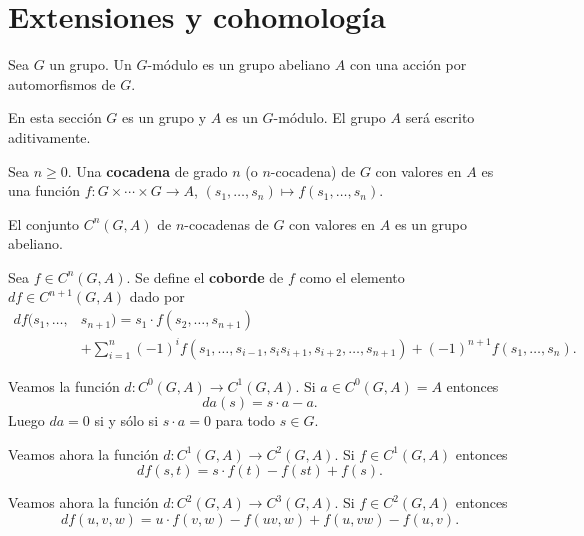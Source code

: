 \chapter{Extensiones y cohomología}

\begin{definition}
	Sea $G$ un grupo. Un $G$-módulo es un grupo abeliano $A$ con una acción por
	automorfismos de $G$. 
\end{definition}

En esta sección $G$ es un grupo y $A$ es un $G$-módulo. El grupo $A$ será
escrito aditivamente. 

\begin{definition}
	Sea $n\geq0$. Una \textbf{cocadena}
	de grado $n$ (o $n$-cocadena) de $G$ con valores en $A$ es una función
	$f\colon G\times\cdots\times G\to A$, $(s_1,\dots,s_n)\mapsto
	f(s_1,\dots,s_n)$. 
\end{definition}

	El conjunto $C^n(G,A)$ de $n$-cocadenas de $G$ con valores en
	$A$ es un grupo abeliano. 

\begin{definition}
	Sea $f\in C^n(G,A)$. Se define el \textbf{coborde} de $f$ como el elemento $df\in
	C^{n+1}(G,A)$ dado por 
	\begin{align*}
		df(s_1,\dots,&s_{n+1})=s_1\cdot f(s_2,\dots,s_{n+1})\\
		&+\sum_{i=1}^n (-1)^i f(s_1,\dots,s_{i-1},s_is_{i+1},s_{i+2},\dots,s_{n+1})
		+(-1)^{n+1}f(s_1,\dots,s_n).
	\end{align*}
\end{definition}

\begin{example}
	Veamos la función $d\colon C^0(G,A)\to C^1(G,A)$.  Si $a\in C^0(G,A)=A$
	entonces 
	\[
	da(s)=s\cdot a-a.
	\]
	Luego $da=0$ si y sólo si $s\cdot a=0$ para
	todo $s\in G$.
\end{example}

\begin{example}
	Veamos ahora la función $d\colon C^1(G,A)\to C^2(G,A)$. Si $f\in C^1(G,A)$
	entonces
	\[
	df(s,t)=s\cdot f(t)-f(st)+f(s).
	\]
\end{example}

\begin{example}
	Veamos ahora la función $d\colon C^2(G,A)\to C^3(G,A)$. Si $f\in C^2(G,A)$
	entonces
	\[
	df(u,v,w)=u\cdot f(v,w)-f(uv,w)+f(u,vw)-f(u,v).
	\]
\end{example}

